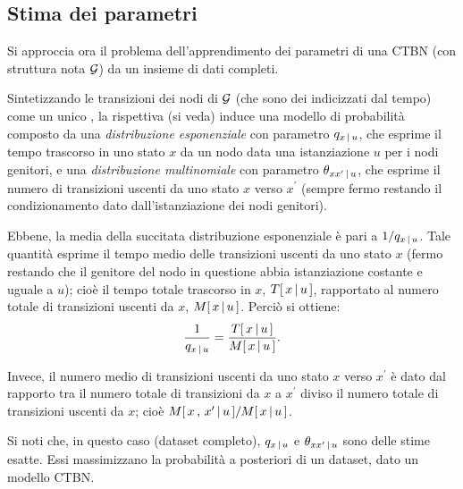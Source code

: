 \subsection{Stima dei parametri}
\label{sec:ctbn-params}
Si approccia ora il problema dell'apprendimento dei parametri di una \acl{CTBN} (con struttura nota $\mathcal{G}$) da un insieme di dati completi.

Sintetizzando le transizioni dei nodi di $\mathcal{G}$ (che sono dei \mprocess{} \cond{} indicizzati dal tempo) come un unico \mprocess*{} \omog*{}, la rispettiva \im*{} (si veda) induce una modello di probabilità composto da una \emph{distribuzione esponenziale} con parametro $q_{x\,\arrowvert\,u}$, che esprime il tempo trascorso in uno stato $x$ da un nodo data una istanziazione $u$ per i nodi genitori, e una \emph{distribuzione multinomiale} con parametro $\theta_{xx^\prime\,\arrowvert\,u}$, che esprime il numero di transizioni uscenti da uno stato $x$ verso $x^\prime$ (sempre fermo restando il condizionamento dato dall'istanziazione dei nodi genitori).

Ebbene, la media della succitata distribuzione esponenziale è pari a $1/q_{x\,\arrowvert\,u}$. Tale quantità esprime il tempo medio delle transizioni uscenti da uno stato $x$ (fermo restando che il genitore del nodo in questione abbia istanziazione costante e uguale a $u$); cioè il tempo totale trascorso in $x$, $T[\,x\,\arrowvert\,u\,]$, rapportato al numero totale di transizioni uscenti da $x$, $\mstat{x\,\arrowvert\,u}$. Perciò si ottiene:
\[
\frac{1}{q_{x\,\arrowvert\,u}}=\frac{\tstat{x\,\arrowvert\,u}}{\mstat{x\,\arrowvert\,u}}\text{.}
\]

Invece, il numero medio di transizioni uscenti da uno stato $x$ verso $x^\prime$ è dato dal rapporto tra il numero totale di transizioni da $x$ a $x^\prime$ diviso il numero totale di transizioni uscenti da $x$; cioè $\mstat[x]{x^\prime\,\arrowvert\,u}/\mstat{x\,\arrowvert\,u}$.

Si noti che, in questo caso (dataset completo), $q_{x\,\arrowvert\,u}$ e $\theta_{xx^\prime\,\arrowvert\,u}$ sono delle stime esatte. Essi massimizzano la probabilità a posteriori di un dataset, dato un modello \acs{CTBN}.

